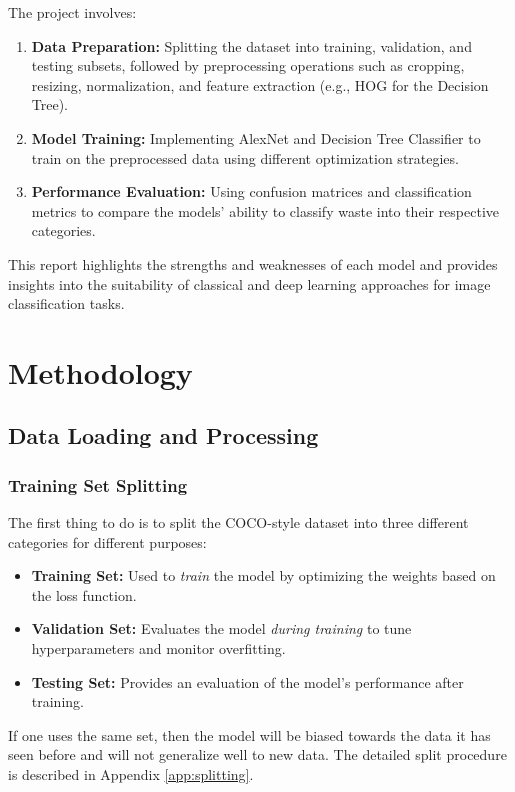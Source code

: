 \documentclass[a4paper,12pt]{article}
\begin{document}
The project involves:
\begin{enumerate}
	\item \textbf{Data Preparation:} Splitting the dataset into training, validation, and testing subsets, followed by preprocessing operations such as cropping, resizing, normalization, and feature extraction (e.g., HOG for the Decision Tree).
	\item \textbf{Model Training:} Implementing AlexNet and Decision Tree Classifier to train on the preprocessed data using different optimization strategies.
	\item \textbf{Performance Evaluation:} Using confusion matrices and classification metrics to compare the models’ ability to classify waste into their respective categories.
\end{enumerate}

This report highlights the strengths and weaknesses of each model and provides insights into the suitability of classical and deep learning approaches for image classification tasks.

\section{Methodology}

\subsection{Data Loading and Processing}

\subsubsection{Training Set Splitting}

The first thing to do is to split the COCO-style dataset into three different categories for different purposes:

\begin{itemize}
	\item \textbf{Training Set:} Used to \textit{train} the model by optimizing the weights based on the loss function.
	\item \textbf{Validation Set:} Evaluates the model \textit{during training} to tune hyperparameters and monitor overfitting.
	\item \textbf{Testing Set:} Provides an evaluation of the model’s performance after training.
\end{itemize}

If one uses the same set, then the model will be biased towards the data it has seen before and will not generalize well to new data. The detailed split procedure is described in Appendix \ref{app:splitting}.
\end{document}
